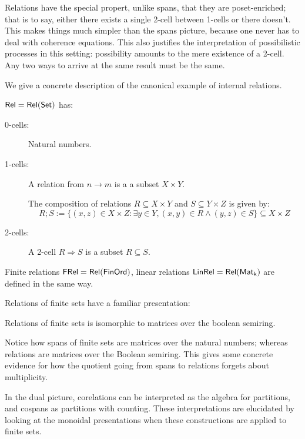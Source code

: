 Relations have the special propert, unlike spans, that they are poset-enriched; that is to say, either there exists a single 2-cell between 1-cells or there doesn't. This makes things much simpler than the spans picture, because one never has to deal with coherence equations.  This also justifies the interpretation of possibilistic processes in this setting: possibility amounts to the mere existence of a 2-cell.  Any two ways to arrive at the same result must be the same.


We give a concrete description of the canonical example of internal relations.


\begin{example}
$\mathsf{Rel}=\mathsf{Rel}(\mathsf{Set})$ has:

\begin{description}
\item[0-cells:] Natural numbers.

\item[1-cells:] A relation from $n\to m$ is a a subset $X \times Y$.

The composition of relations $R \subseteq X \times Y$  and $S \subseteq Y \times Z$ is given by:
$$
R;S := \{  (x,z) \in X\times Z: \exists y \in Y, (x,y) \in R \wedge (y,z) \in S \} \subseteq X\times Z
$$ 

\item[2-cells:] 
A 2-cell $R\Rightarrow S$ is a subset $R\subseteq S$.
\end{description}

Finite relations $\mathsf{FRel}=\mathsf{Rel}(\mathsf{FinOrd})$, linear relations $\sf LinRel=\mathsf{Rel}(\mathsf{Mat}_k)$ are defined in the same way.
\end{example}



Relations of finite sets have a familiar presentation:

\begin{lemma}
Relations of finite sets is isomorphic to matrices over the boolean semiring.
\end{lemma}



Notice how spans of finite sets are matrices over the natural numbers; whereas relations are matrices over the Boolean semiring.  This gives some concrete evidence for how the quotient going from spans to relations forgets about multiplicity.


In the dual picture, corelations can be interpreted as the algebra for  partitions, and cospans as partitions with counting.  These interpretations are elucidated by looking at the monoidal presentations when these constructions are applied to finite sets.

